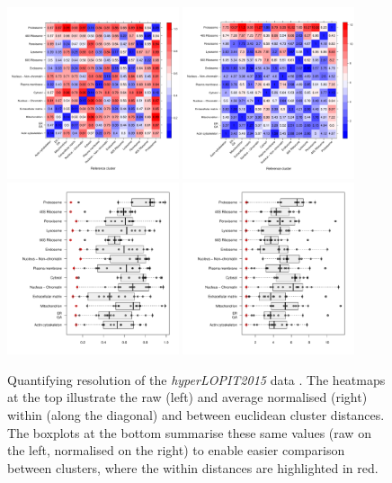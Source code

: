 \documentclass[12pt]{article}\usepackage[]{graphicx}\usepackage[]{color}
\begin{document}
\begin{figure}[!ht]
  \centering
  \includegraphics[width = 0.45\textwidth]{./figure/qsep0lv-1.pdf}
  \includegraphics[width = 0.45\textwidth]{./figure/qsep0lv-2.pdf}
  \includegraphics[width = 0.45\textwidth]{./figure/qsep0bx-1.pdf}
  \includegraphics[width = 0.45\textwidth]{./figure/qsep0bx-2.pdf}
  \caption{Quantifying resolution of the \textit{hyperLOPIT2015} data
    \citet{Christoforou:2016}. The heatmaps at the top illustrate the
    raw (left) and average normalised (right) within (along the
    diagonal) and between euclidean cluster distances. The boxplots at
    the bottom summarise these same values (raw on the left,
    normalised on the right) to enable easier comparison between
    clusters, where the within distances are highlighted in red. }
  \label{fig:qsep0}
\end{figure}
\end{document}

